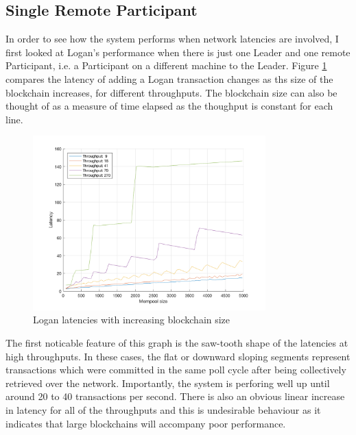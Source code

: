 \documentclass[12pt,a4paper,twoside,openright]{report}
\begin{document}
	\subsection{Single Remote Participant}
	In order to see how the system performs when network latencies are involved, I first looked at Logan's performance when there is just one Leader and one remote Participant, i.e. a Participant on a different machine to the Leader.
	Figure \ref{figs:remlatencysize} compares the latency of adding a Logan transaction changes as ths size of the blockchain increases, for different throughputs.
	The blockchain size can also be thought of as a measure of time elapsed as the thoughput is constant for each line.
	\begin{figure}
		\centering
		\includegraphics[width=0.8\textwidth]{figs/latencies_sizes_throughputs.png}
		\caption{Logan latencies with increasing blockchain size}
		\label{figs:remlatencysize}
	\end{figure}
	The first noticable feature of this graph is the saw-tooth shape of the latencies at high throughputs.
	In these cases, the flat or downward sloping segments represent transactions which were committed in the same poll cycle after being collectively retrieved over the network.
	Importantly, the system is perforing well up until around 20 to 40 transactions per second.
	There is also an obvious linear increase in latency for all of the throughputs and this is undesirable behaviour as it indicates that large blockchains will accompany poor performance. \\
	
\end{document}
